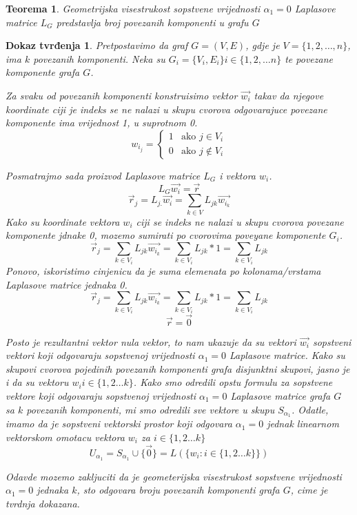 \documentclass[11pt]{article}
\newtheorem{theorem}{Teorema}
\newtheorem*{custom_proof}{Dokaz tvrđenja}
\begin{document}
	\begin{theorem} 
	Geometrijska visestrukost sopstvene vrijednosti $\alpha_1 = 0$ Laplasove matrice $L_G$ predstavlja broj povezanih komponenti u grafu $G$
	\end{theorem}
	
	\begin{custom_proof}
	Pretpostavimo da graf  $G = (V, E)$, gdje je $V = \{1, 2, \dots, n\}$, ima $k$ povezanih komponenti. Neka su $G_i = \{V_i,E_i\} i \in \{1,2, \dots n\}$ te povezane komponente grafa $G$.
	
	Za svaku od povezanih komponenti konstruisimo vektor $\vec{w_i}$ takav da njegove koordinate ciji je indeks se ne nalazi u skupu cvorova odgovarajuce povezane komponente ima vrijednost 1, u suprotnom 0.
	\[
	 w_{i_j} =
	 \begin{cases}
	 1  & \text{ako } j \in V_i \\ 
	 0  & \text{ako } j \notin V_i
	 \end{cases}
	\]
	
	Posmatrajmo sada proizvod Laplasove matrice $L_G$ i vektora $w_i$.
	\[
	L_G\vec{w_i} = \vec{r}
	\]
	\[
	\vec{r}_j = L_{j.} \vec{w_i} = \sum_{ k  \in V} L_{jk}\vec{w_{i_k}} 
	\]
	Kako su koordinate vektora $w_i$ ciji se indeks ne nalazi u skupu cvorova povezane komponente jdnake 0, mozemo sumirati po cvorovima poveyane komponente $G_i$. 
	\[
	\vec{r}_j = \sum_{ k  \in V_i} L_{jk}\vec{w_{i_k}} = \sum_{ k  \in V_i} L_{jk} * 1 = \sum_{ k  \in V_i} L_{jk}
	\]
	Ponovo, iskoristimo cinjenicu da je suma elemenata po kolonama/vrstama Laplasove matrice jednaka 0.
	\[
	\vec{r}_j = \sum_{ k  \in V_i} L_{jk}\vec{w_{i_k}} = \sum_{ k  \in V_i} L_{jk} * 1 = \sum_{ k  \in V_i} L_{jk}
	\]
	\[
	\vec{r} = \vec{0}
	\]
	
	Posto je rezultantni vektor nula vektor, to nam ukazuje da su vektori $\vec{w_i}$ sopstveni vektori koji odgovaraju sopstvenoj vrijednosti  $\alpha_1 = 0$ Laplasove matrice.
	Kako su skupovi cvorova pojedinih povezanih komponenti grafa disjunktni skupovi, jasno je i da su vektoru $w_i i \in \{1,2 \dots k\}$. Kako smo odredili opstu formulu za sopstvene vektore koji  odgovaraju sopstvenoj vrijednosti  $\alpha_1 = 0$ Laplasove matrice grafa $G$ sa $k$ povezanih komponenti, mi smo odredili sve vektore u skupu $S_{\alpha_1}$. Odatle, imamo da je sopstveni vektorski prostor koji  odgovara $\alpha_1 = 0$ jednak linearnom vektorskom omotacu vektora $w_i$ za $i \in \{1,2 \dots k\}$
	\[
	U_{\alpha_1} = S_{\alpha_1} \cup \{\vec{0}\}= L (\{ w_i : i \in \{1,2 \dots k\}\})
	\]
	
	Odavde mozemo zakljuciti da je geometerijska visestrukost sopstvene vrijednosti $\alpha_1 = 0$ jednaka $k$, sto odgovara broju povezanih komponenti grafa $G$, cime je tvrdnja dokazana.
	\end{custom_proof}
	
\end{document}
